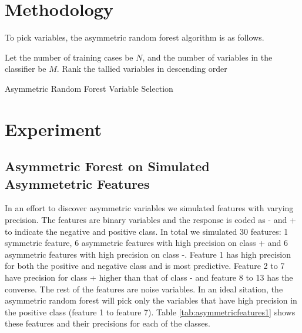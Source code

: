 \documentclass[twoside,11pt]{article}
\begin{document}
\section{Methodology}
To pick variables, the asymmetric random forest algorithm is as follows.

\begin{algorithm}
Let the number of training cases be $N$, and the number of variables in the classifier be $M$.
Rank the tallied variables in descending order 

\caption{Asymmetric Random Forest Variable Selection}\label{algo: AsymRandomForest}
\end{algorithm}

\section{Experiment}
\subsection{Asymmetric Forest on Simulated Asymmetetric Features}
In an effort to discover asymmetric variables we simulated features with varying precision. The features are binary variables and the response is coded as - and + to indicate the negative and positive class. In total we simulated 30 features: 1 symmetric feature, 6 asymmetric features with high precision on class + and 6 asymmetric features with high precision on class -. Feature 1 has high precision for both the positive and negative class and is most predictive. Feature 2 to 7 have precision for class + higher than that of class - and feature 8 to 13 has the converse. The rest of the features are noise variables. In an ideal sitation, the asymmetric random forest will pick only the variables that have high precision in the positive class (feature 1 to feature 7). Table \ref{tab:asymmetricfeatures1} shows these features and their precisions for each of the classes.
\end{document}
